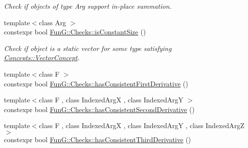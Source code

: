 \begin{DoxyCompactItemize}
\begin{DoxyCompactList}\small\item\em Check if objects of type Arg support in-\/place summation. \end{DoxyCompactList}\item 
{\footnotesize template$<$class Arg $>$ }\\constexpr bool \hyperlink{namespaceFunG_1_1Checks_adcc3e179af2ed0384a3773ea086045b9}{Fun\+G\+::\+Checks\+::is\+Constant\+Size} ()
\begin{DoxyCompactList}\small\item\em Check if object is a static vector for some type satisfying \hyperlink{structFunG_1_1Concepts_1_1VectorConcept}{Concepts\+::\+Vector\+Concept}. \end{DoxyCompactList}\item 
{\footnotesize template$<$class F $>$ }\\constexpr bool \hyperlink{namespaceFunG_1_1Checks_a5f9a3a474205df6f565dd1a03ebb5e28}{Fun\+G\+::\+Checks\+::has\+Consistent\+First\+Derivative} ()
\item 
{\footnotesize template$<$class F , class Indexed\+Arg\+X , class Indexed\+Arg\+Y $>$ }\\constexpr bool \hyperlink{namespaceFunG_1_1Checks_a072e2c21fa90be998a34975fb2975772}{Fun\+G\+::\+Checks\+::has\+Consistent\+Second\+Derivative} ()
\item 
{\footnotesize template$<$class F , class Indexed\+Arg\+X , class Indexed\+Arg\+Y , class Indexed\+Arg\+Z $>$ }\\constexpr bool \hyperlink{namespaceFunG_1_1Checks_aad092e45db1d0c1d7b6f69a5562679fa}{Fun\+G\+::\+Checks\+::has\+Consistent\+Third\+Derivative} ()
\end{DoxyCompactItemize}
